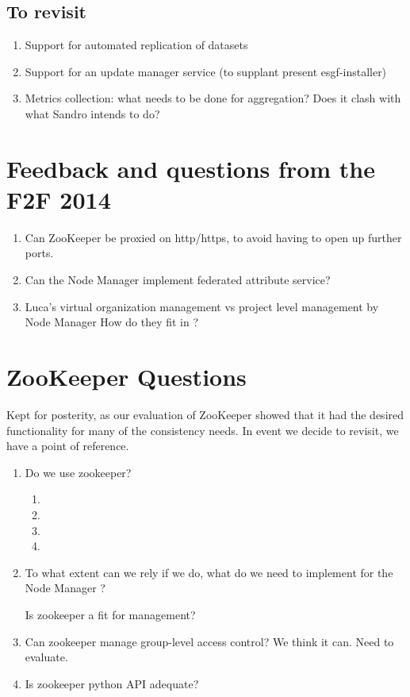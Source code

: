 \documentclass[oneside,12pt]{memoir}
\def\nm{Node Manager{ }}
\begin{document}
\section{To revisit}
\begin{enumerate}
\item Support for automated replication of datasets
\item Support for an update manager service (to supplant present esgf-installer)
\item Metrics collection: what needs to be done for aggregation? Does it clash with what Sandro intends to do?
\end{enumerate}


\begin{appendices}


\chapter{Feedback and questions from the F2F 2014}
\begin{enumerate}
\item Can ZooKeeper be proxied on http/https, to avoid having to open up further ports.
\item Can the \nm implement federated attribute service?
\item Luca's virtual organization management vs project level management by \nm How do they fit in ?
\end{enumerate}



\chapter{ZooKeeper Questions}
Kept for posterity, as our evaluation of ZooKeeper showed that it had the desired functionality for many of the consistency needs.  In event we decide to revisit, we have a point of reference. 
\begin{enumerate}

\item
Do we use zookeeper?
\begin{enumerate}
\item {}
\item {}
\item {}
\item {} 
\end{enumerate}
\item
To what extent can we rely if we do,  what do we need to implement for the \nm?

Is zookeeper a fit for management?
\item
Can zookeeper manage group-level access control?  We think it can.  Need to evaluate.
\item
Is zookeeper python API adequate?
\end{enumerate}
\end{appendices}
\printbibliography
\hypertarget{mymarker}{}
\printindex
\end{document}
